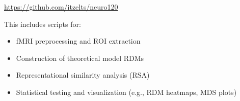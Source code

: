 \documentclass{article}
\begin{document}
\begin{center}
\url{https://github.com/itzelts/neuro120}
\end{center}

This includes scripts for:
\begin{itemize}
    \item fMRI preprocessing and ROI extraction
    \item Construction of theoretical model RDMs
    \item Representational similarity analysis (RSA)
    \item Statistical testing and visualization (e.g., RDM heatmaps, MDS plots)
\end{itemize}
    
\end{document}
